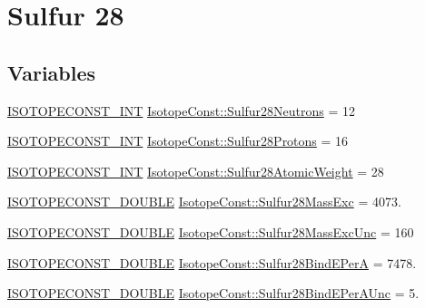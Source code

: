 \hypertarget{group___isotope_const-_sulfur-_s28}{}\section{Sulfur 28}
\label{group___isotope_const-_sulfur-_s28}
\subsection*{Variables}
\begin{DoxyCompactItemize}
\item 
\mbox{\hyperlink{group___isotope_const-_macros_ga5f18360b3e99483a35c32d789e62621c}{I\+S\+O\+T\+O\+P\+E\+C\+O\+N\+S\+T\+\_\+\+I\+NT}} \mbox{\hyperlink{group___isotope_const-_sulfur-_s28_ga624aca0aeed1104bb0bd1b461e12d9da}{Isotope\+Const\+::\+Sulfur28\+Neutrons}} = 12
\item 
\mbox{\hyperlink{group___isotope_const-_macros_ga5f18360b3e99483a35c32d789e62621c}{I\+S\+O\+T\+O\+P\+E\+C\+O\+N\+S\+T\+\_\+\+I\+NT}} \mbox{\hyperlink{group___isotope_const-_sulfur-_s28_ga5950e4a7212f8f2b72f5a407e020ac45}{Isotope\+Const\+::\+Sulfur28\+Protons}} = 16
\item 
\mbox{\hyperlink{group___isotope_const-_macros_ga5f18360b3e99483a35c32d789e62621c}{I\+S\+O\+T\+O\+P\+E\+C\+O\+N\+S\+T\+\_\+\+I\+NT}} \mbox{\hyperlink{group___isotope_const-_sulfur-_s28_ga3cbc52f3afaf867d9c9bd57f68b3a2bb}{Isotope\+Const\+::\+Sulfur28\+Atomic\+Weight}} = 28
\item 
\mbox{\hyperlink{group___isotope_const-_macros_ga8f45a7272ce02c0b4c65c44636ed719a}{I\+S\+O\+T\+O\+P\+E\+C\+O\+N\+S\+T\+\_\+\+D\+O\+U\+B\+LE}} \mbox{\hyperlink{group___isotope_const-_sulfur-_s28_gad353eefb677ff82a35adb84eee9a59e3}{Isotope\+Const\+::\+Sulfur28\+Mass\+Exc}} = 4073.
\item 
\mbox{\hyperlink{group___isotope_const-_macros_ga8f45a7272ce02c0b4c65c44636ed719a}{I\+S\+O\+T\+O\+P\+E\+C\+O\+N\+S\+T\+\_\+\+D\+O\+U\+B\+LE}} \mbox{\hyperlink{group___isotope_const-_sulfur-_s28_ga1b950e05c8794e480b83ce8793e4203c}{Isotope\+Const\+::\+Sulfur28\+Mass\+Exc\+Unc}} = 160
\item 
\mbox{\hyperlink{group___isotope_const-_macros_ga8f45a7272ce02c0b4c65c44636ed719a}{I\+S\+O\+T\+O\+P\+E\+C\+O\+N\+S\+T\+\_\+\+D\+O\+U\+B\+LE}} \mbox{\hyperlink{group___isotope_const-_sulfur-_s28_ga11c50413357a08d4e56fe1d9637c085a}{Isotope\+Const\+::\+Sulfur28\+Bind\+E\+PerA}} = 7478.
\item 
\mbox{\hyperlink{group___isotope_const-_macros_ga8f45a7272ce02c0b4c65c44636ed719a}{I\+S\+O\+T\+O\+P\+E\+C\+O\+N\+S\+T\+\_\+\+D\+O\+U\+B\+LE}} \mbox{\hyperlink{group___isotope_const-_sulfur-_s28_gadde1925f46fa9808c4d7eccc952355ad}{Isotope\+Const\+::\+Sulfur28\+Bind\+E\+Per\+A\+Unc}} = 5.

\end{DoxyCompactItemize}
